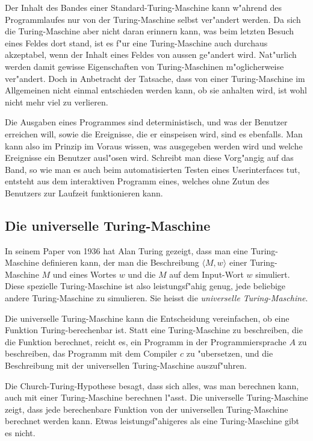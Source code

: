 Der Inhalt des Bandes einer Standard-Turing-Maschine kann w"ahrend des
Programmlaufes nur von der Turing-Maschine selbst ver"andert werden.
Da sich die Turing-Maschine aber nicht daran erinnern kann, was beim
letzten Besuch eines Feldes dort stand, ist es f"ur eine Turing-Maschine
auch durchaus akzeptabel, wenn der Inhalt eines Feldes von aussen
ge"andert wird. Nat"urlich werden damit gewisse Eigenschaften von
Turing-Maschinen m"oglicherweise ver"andert. Doch in Anbetracht der
Tatsache, dass von einer Turing-Maschine im Allgemeinen nicht einmal
entschieden werden kann, ob sie anhalten wird, ist wohl nicht mehr
viel zu verlieren.

Die Ausgaben eines Programmes sind deterministisch, und was der Benutzer
erreichen will, sowie die Ereignisse, die er einspeisen wird, sind es ebenfalls.
Man kann also im Prinzip im Voraus wissen, was ausgegeben werden wird
und welche Ereignisse ein Benutzer ausl"osen wird. Schreibt man diese
Vorg"angig auf das Band, so wie man es auch beim automatisierten Testen
eines Userinterfaces tut, entsteht aus dem interaktiven Programm eines,
welches ohne Zutun des Benutzers zur Laufzeit funktionieren kann.

\subsection{Die universelle Turing-Maschine}
In seinem Paper von 1936 hat Alan Turing gezeigt, dass man eine
Turing-Maschine definieren kann,
der man die Beschreibung
$\langle M,w\rangle$
einer Turing-Maschine $M$ und eines Wortes $w$
und die $M$ auf dem Input-Wort $w$ simuliert.
Diese spezielle Turing-Maschine ist also leistungsf"ahig genug, jede
beliebige andere Turing-Maschine zu simulieren. Sie heisst die {\em universelle
Turing-Maschine}.

Die universelle Turing-Maschine kann die Entscheidung vereinfachen,
ob eine Funktion Turing-berechenbar ist. Statt eine Turing-Maschine
zu beschreiben, die die Funktion berechnet, reicht es, ein Programm
in der Programmiersprache $A$ zu beschreiben, das Programm mit dem
Compiler $c$ zu "ubersetzen, und die Beschreibung mit der universellen
Turing-Maschine auszuf"uhren.

Die Church-Turing-Hypothese besagt, dass sich alles, was man berechnen
kann, auch mit einer Turing-Maschine berechnen l"asst. Die universelle
Turing-Maschine zeigt, dass jede berechenbare Funktion von der
universellen Turing-Maschine berechnet werden kann.
Etwas leistungsf"ahigeres als eine Turing-Maschine gibt es nicht.

